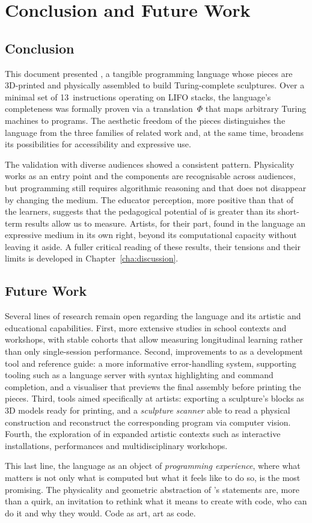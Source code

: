 
\chapter{Conclusion and Future Work}
\label{cha:conclusion}
\section{Conclusion}
This document presented \sculpt, a tangible programming language whose pieces are 3D-printed and physically assembled to build Turing-complete sculptures.
Over a minimal set of 13~instructions operating on LIFO stacks, the language's completeness was formally proven via a translation~$\Phi$ that maps arbitrary Turing machines to \sculpt programs.
The aesthetic freedom of the pieces distinguishes the language from the three families of related work and, at the same time, broadens its possibilities for accessibility and expressive use.

The validation with diverse audiences showed a consistent pattern.
Physicality works as an entry point and the components are recognisable across audiences, but programming still requires algorithmic reasoning and that does not disappear by changing the medium.
The educator perception, more positive than that of the learners, suggests that the pedagogical potential of \sculpt is greater than its short-term results allow us to measure.
Artists, for their part, found in the language an expressive medium in its own right, beyond its computational capacity without leaving it aside.
A fuller critical reading of these results, their tensions and their limits is developed in Chapter~\ref{cha:discussion}.

\section{Future Work}
Several lines of research remain open regarding the language and its artistic and educational capabilities.
First, more extensive studies in school contexts and workshops, with stable cohorts that allow measuring longitudinal learning rather than only single-session performance.
Second, improvements to \sculpter as a development tool and reference guide: a more informative error-handling system, supporting tooling such as a language server with syntax highlighting and command completion, and a visualiser that previews the final assembly before printing the pieces.
Third, tools aimed specifically at artists: exporting a sculpture's blocks as 3D models ready for printing, and a \emph{sculpture scanner} able to read a physical construction and reconstruct the corresponding program via computer vision.
Fourth, the exploration of \sculpt in expanded artistic contexts such as interactive installations, performances and multidisciplinary workshops.

This last line, the language as an object of \emph{programming experience}, where what matters is not only what is computed but what it feels like to do so, is the most promising.
The physicality and geometric abstraction of \sculpt's statements are, more than a quirk, an invitation to rethink what it means to create with code, who can do it and why they would.
Code as art, art as code.

\endinput

